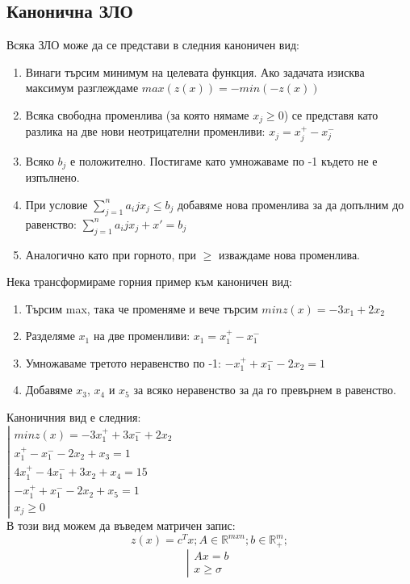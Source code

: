 \documentclass[12pt, a4paper]{article}
\def\D{\mathbb}
\begin{document}
\subsection*{Канонична ЗЛО}
Всяка ЗЛО може да се представи в следния каноничен вид:\\
\begin{enumerate}
	\item Винаги търсим минимум на целевата функция. Ако задачата изисква максимум разглеждаме $max(z(x)) = -min(-z(x))$
	\item Всяка свободна променлива (за която нямаме $x_j\geq0$) се представя като разлика на две нови неотрицателни променливи: $x_j = x_j^+ - x_j^-$
	\item Всяко $b_j$ е положително. Постигаме като умножаваме по -1 където не е изпълнено.
	\item При условие $\sum_{j=1}^{n}a_ijx_j\leq b_j$ добавяме нова променлива за да допълним до равенство: $\sum_{j=1}^{n}a_ijx_j+x'= b_j$
	\item Аналогично като при горното, при $\geq$ изваждаме нова променлива.
\end{enumerate}
Нека трансформираме горния пример към каноничен вид:\\
\begin{enumerate}
	\item Търсим max, така че променяме и вече търсим $min z(x) = -3x_1 + 2x_2$
	\item Разделяме $x_1$ на две променливи: $x_1 = x_1^+ - x_1^-$ 
	\item Умножаваме третото неравенство по -1: $-x_1^+ +x_1^--2x_2=1$
	\item Добавяме $x_3$, $x_4$ и $x_5$ за всяко неравенство за да го превърнем в равенство.
\end{enumerate}
Каноничния вид е следния:\\
$
\left|
\begin{array}{l}
	min z(x) = -3x_1^+ +3x_1^- +2x_2\\
	x_1^+-x_1^--2x_2+x_3=1\\
	4x_1^+-4x_1^-+3x_2+x_4=15\\
	-x_1^++x_1^--2x_2+x_5=1\\
	x_j\geq0
\end{array}
\right.
$\\
В този вид можем да въведем матричен запис:
\[z(x)=c^Tx; A\in \D{R}^{mxn}; b\in\D{R}_+^m;\]
\[
\left|
\begin{array}{l}
	Ax=b\\
	x\geq\sigma
\end{array}
\right.
\]
\end{document}
